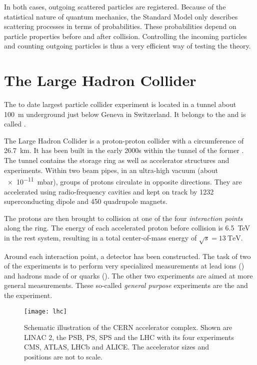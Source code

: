 In both cases, outgoing scattered particles are registered. 
Because of the statistical nature of quantum mechanics, the Standard Model only describes scattering processes in terms of probabilities. These probabilities depend on particle properties before and after collision. 
Controlling the incoming particles and counting outgoing particles is thus a very efficient way of testing the theory.

\section{The Large Hadron Collider}
The to date largest particle collider experiment is located in a tunnel about \SI{100}{\m} underground just below Geneva in Switzerland. It belongs to the  and is called .

The Large Hadron Collider is a proton-proton collider with a circumference of \SI{26.7}{\km}. It has been built in the early 2000s within the tunnel of the former . The tunnel contains the storage ring as well as accelerator structures and experiments. Within two beam pipes, in an ultra-high vacuum (about \SI{e-11}{\milli\bar}), groups of protons circulate in opposite directions. They are accelerated using radio-frequency cavities and kept on track by \num{1232} superconducting dipole and \num{450} quadrupole magnets.

The protons are then brought to collision at one of the four \emph{interaction points} along the ring. The energy of each accelerated proton before collision is \SI{6.5}{\TeV} in the rest system, resulting in a total center-of-mass energy of $\sqrt{s} = \SI{13}{\TeV}$.

Around each interaction point, a detector has been constructed. The task of two of the experiments is to perform very specialized measurements at lead ions () and hadrons made of \Pcharm or \Pbottom quarks (). 
The other two experiments are aimed at more general measurements. These so-called \emph{general purpose} experiments are the  and the  experiment\cite{Evans:LHCMachine}. 

\begin{figure}
    \centering
    \texttt{[image: lhc]}
    \caption{Schematic illustration of the \acs{CERN} accelerator complex. Shown are \ac{LINAC} 2, the \ac{PSB}, \ac{PS}, \ac{SPS} and the LHC with its four experiments \acs{CMS}, \acs{ATLAS}, \acs{LHCb} and \acs{ALICE}. The accelerator sizes and positions are not to scale\cite{Ley:CERNAccelerators,Caron:LHCLayout
    ,DeMelis:CERNacceleratorcomplex}.}
    \label{figure:LHC}
\end{figure}

